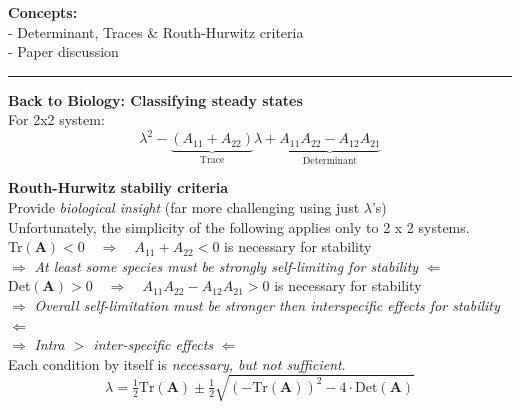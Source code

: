 \documentclass{article}
\newcommand{\ind}{\-\hspace{1cm}}
\begin{document}
\noindent{}

\textbf{Concepts:}\\
\ind - Determinant, Traces \& Routh-Hurwitz criteria\\
\ind - Paper discussion

\rule[0.5ex]{\linewidth}{1pt}

\textbf{Back to Biology:  Classifying steady states}\\
For 2x2 system:
\begin{equation*}
	\lambda^2 - \underbrace{(A_{11}+A_{22})}_{\text{Trace}}\lambda + \underbrace{A_{11}A_{22} - A_{12}A_{21}}_{\text{Determinant}}
\end{equation*}

\textbf{Routh-Hurwitz stabiliy criteria}\\
\ind \ind Provide \emph{biological insight} (far more challenging using just $\lambda$'s)\\
\ind \ind Unfortunately, the simplicity of the following applies only to 2 x 2 systems.\\

\ind Tr$(\mathbf{A})<0 \quad \Rightarrow \quad A_{11}+A_{22}<0$ is necessary for stability\\
\ind \ind $\Rightarrow$ \emph{At least some species must be strongly self-limiting for stability} $\Leftarrow$ \\

\ind Det$(\mathbf{A})>0  \quad \Rightarrow \quad A_{11} A_{22} - A_{12} A_{21} > 0$ is necessary for stability\\
\ind \ind $\Rightarrow$ \emph{Overall self-limitation must be stronger then interspecific effects for stability} $\Leftarrow$\\
\ind \ind $\Rightarrow$ \emph{Intra $>$ inter-specific effects} $\Leftarrow$ \\

Each condition by itself is \emph{necessary, but not sufficient}.
\begin{equation*}
	\lambda = \tfrac{1}{2}\text{Tr}(\textbf{A}) \pm \tfrac{1}{2}\sqrt{(-\text{Tr}(\textbf{A}))^2 - 4\cdot\text{Det}(\textbf{A})}
\end{equation*}
\end{document}
